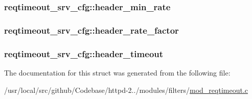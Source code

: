 \subsubsection[{\texorpdfstring{header\+\_\+min\+\_\+rate}{header_min_rate}}]{ reqtimeout\+\_\+srv\+\_\+cfg\+::header\+\_\+min\+\_\+rate}\hypertarget{structreqtimeout__srv__cfg_a96c8fab20f32b4a5791cc89c9352606f}{}\label{structreqtimeout__srv__cfg_a96c8fab20f32b4a5791cc89c9352606f}
\subsubsection[{\texorpdfstring{header\+\_\+rate\+\_\+factor}{header_rate_factor}}]{ reqtimeout\+\_\+srv\+\_\+cfg\+::header\+\_\+rate\+\_\+factor}\hypertarget{structreqtimeout__srv__cfg_a104ad3dc90893ed3445267b4da4224d9}{}\label{structreqtimeout__srv__cfg_a104ad3dc90893ed3445267b4da4224d9}
\subsubsection[{\texorpdfstring{header\+\_\+timeout}{header_timeout}}]{ reqtimeout\+\_\+srv\+\_\+cfg\+::header\+\_\+timeout}\hypertarget{structreqtimeout__srv__cfg_af612d318e28c52682292f7cd3838e127}{}\label{structreqtimeout__srv__cfg_af612d318e28c52682292f7cd3838e127}


The documentation for this struct was generated from the following file\+:\begin{DoxyCompactItemize}
\item 
/usr/local/src/github/\+Codebase/httpd-\/2../modules/filters/\hyperlink{mod__reqtimeout_8c}{mod\+\_\+reqtimeout.\+c}\end{DoxyCompactItemize}
